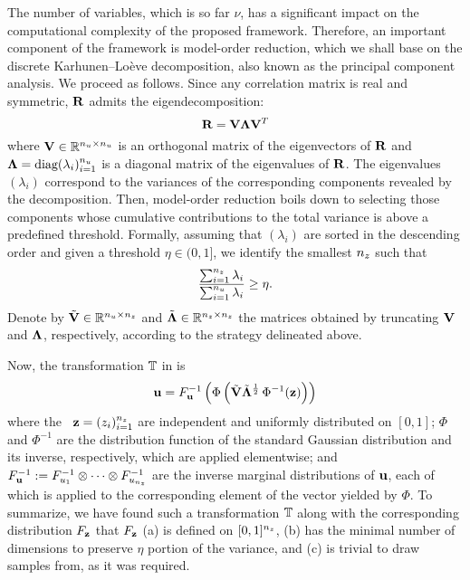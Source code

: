The number of variables, which is so far $\nu$, has a significant impact on the
computational complexity of the proposed framework. Therefore, an important
component of the framework is model-order reduction, which we shall base on the
discrete Karhunen--Lo\`{e}ve decomposition, also known as the principal
component analysis. We proceed as follows. Since any correlation matrix is real
and symmetric, $\mathbf{R}$ admits the eigendecomposition:
\[
  \mathbf{R} = \mathbf{V} \mathbf{\Lambda} \mathbf{V}^T
\]
where $\mathbf{V} \in \mathbb{R}^{{n_u} \times {n_u}}$ is an orthogonal matrix of the
eigenvectors of $\mathbf{R}$ and $\mathbf{\Lambda} = \text{diag}(\lambda_i)_{i = 1}^{n_u}$
is a diagonal matrix of the eigenvalues of $\mathbf{R}$. The eigenvalues
$(\lambda_i)$ correspond to the variances of the corresponding components
revealed by the decomposition. Then, model-order reduction boils down to
selecting those components whose cumulative contributions to the total variance
is above a predefined threshold. Formally, assuming that $(\lambda_i)$ are
sorted in the descending order and given a threshold $\eta \in (0, 1]$, we
identify the smallest ${n_z}$ such that
\[
  \frac{\sum_{i = 1}^{n_z} \lambda_i}{\sum_{i = 1}^{n_u} \lambda_i} \geq \eta.
\]
Denote by $\tilde{\mathbf{V}} \in \mathbb{R}^{{n_u} \times {n_z}}$ and $\tilde{\mathbf{\Lambda}}
\in\mathbb{R}^{{n_z} \times {n_z}}$ the matrices obtained by truncating $\mathbf{V}$ and
$\mathbf{\Lambda}$, respectively, according to the strategy delineated above.

Now, the transformation $\mathbb{T}$ in  is
\begin{equation} \elab{transformation}
  \vu = \distribution_\vu^{-1} \left( \Phi\left( \tilde{\m{V}} \tilde{\m{\Lambda}}^\frac{1}{2} \, \Phi^{-1}(\vz) \right) \right)
\end{equation}
where the \rvs\ $\mathbf{z} = (z_i)_{i = 1}^{n_z}$ are independent and uniformly
distributed on $[0, 1]$; $\Phi$ and $\Phi^{-1}$ are the distribution function of
the standard Gaussian distribution and its inverse, respectively, which are
applied elementwise; and $F_{\mathbf{u}}^{-1} := F_{u_1}^{-1}
\otimes \cdots \otimes F_{u_{n_z}}^{-1}$ are the inverse marginal
distributions of $\mathbf{u}$, each of which is applied to the corresponding element of
the vector yielded by $\Phi$. To summarize, we have found such a transformation
$\mathbb{T}$ along with the corresponding distribution $F_{\mathbf{z}}$
that $F_{\mathbf{z}}$ (a) is defined on $[0, 1]^{n_z}$, (b) has the minimal
number of dimensions to preserve $\eta$ portion of the variance, and (c) is
trivial to draw samples from, as it was required.
